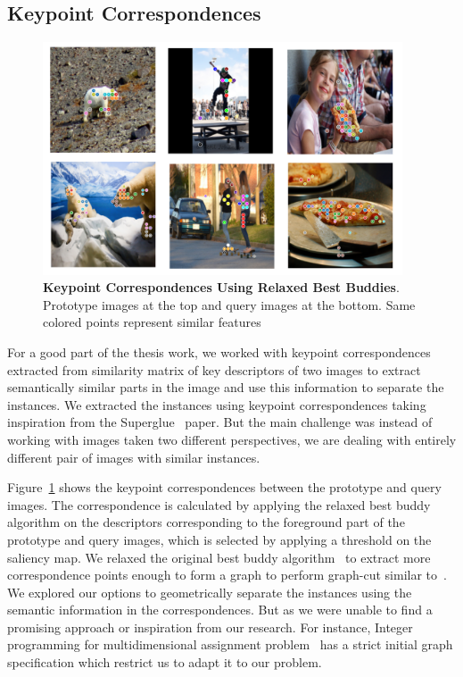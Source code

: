 \subsection{Keypoint Correspondences}
\label{section:keypoint-correspondences}
\begin{figure}
	\centering
	\includegraphics[width=0.95\textwidth]{Images/main/correspondences.png}
	\caption[\textbf{Keypoint Correspondences Using Relaxed Best Buddies}]{\textbf{Keypoint Correspondences Using Relaxed Best Buddies}. Prototype images at the top and query images at the bottom. Same colored points represent similar features }
	\label{fig:correspondecences}
\end{figure}

For a good part of the thesis work, we worked with keypoint correspondences extracted from similarity matrix of key descriptors of two images to extract semantically similar parts in the image and use this information to separate the instances. We extracted the instances using keypoint correspondences taking inspiration from the Superglue~\cite{sarlin2020supergluelearningfeaturematching} paper. But the main challenge was instead of working with images taken two different perspectives, we are dealing with entirely different pair of images with similar instances.

Figure~\ref{fig:correspondecences} shows the keypoint correspondences between the prototype and query images. The correspondence is calculated by applying the relaxed best buddy algorithm on the descriptors corresponding to the foreground part of the prototype and query images, which is selected by applying a threshold on the saliency map. We relaxed the original best buddy algorithm~\cite{Aberman_2018} to extract more correspondence points enough to form a graph to perform graph-cut similar to~\cite{wang2022tokencut, sarlin2020supergluelearningfeaturematching}. We explored our options to geometrically separate the instances using the semantic information in the correspondences. But as we were unable to find a promising approach or inspiration from our research. For instance, Integer programming for multidimensional assignment problem~\cite{WALTEROS2014553} has a strict initial graph specification which restrict us to adapt it to our problem.

